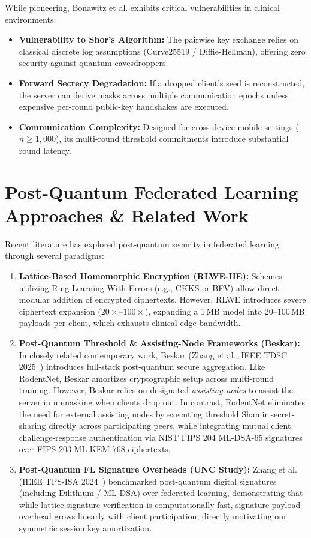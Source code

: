 \documentclass[11pt,a4paper]{report}
\begin{document}
While pioneering, Bonawitz et al. exhibits critical vulnerabilities in clinical environments:
\begin{itemize}[itemsep=2pt]
  \item \textbf{Vulnerability to Shor's Algorithm:} The pairwise key exchange relies on classical discrete log assumptions (Curve25519 / Diffie-Hellman), offering zero security against quantum eavesdroppers.
  \item \textbf{Forward Secrecy Degradation:} If a dropped client's seed is reconstructed, the server can derive masks across multiple communication epochs unless expensive per-round public-key handshakes are executed.
  \item \textbf{Communication Complexity:} Designed for cross-device mobile settings ($n \ge 1{,}000$), its multi-round threshold commitments introduce substantial round latency.
\end{itemize}

\section{Post-Quantum Federated Learning Approaches \& Related Work}
Recent literature has explored post-quantum security in federated learning through several paradigms:
\begin{enumerate}[itemsep=2pt]
  \item \textbf{Lattice-Based Homomorphic Encryption (RLWE-HE):} Schemes utilizing Ring Learning With Errors (e.g., CKKS or BFV) allow direct modular addition of encrypted ciphertexts. However, RLWE introduces severe ciphertext expansion ($20\times\text{--}100\times$), expanding a 1\,MB model into 20--100\,MB payloads per client, which exhausts clinical edge bandwidth.
  \item \textbf{Post-Quantum Threshold \& Assisting-Node Frameworks (Beskar):} In closely related contemporary work, Beskar (Zhang et al., IEEE TDSC 2025~\cite{beskar2025}) introduces full-stack post-quantum secure aggregation. Like RodentNet, Beskar amortizes cryptographic setup across multi-round training. However, Beskar relies on designated \emph{assisting nodes} to assist the server in unmasking when clients drop out. In contrast, RodentNet eliminates the need for external assisting nodes by executing threshold Shamir secret-sharing directly across participating peers, while integrating mutual client challenge-response authentication via NIST FIPS 204 ML-DSA-65 signatures over FIPS 203 ML-KEM-768 ciphertexts.
  \item \textbf{Post-Quantum FL Signature Overheads (UNC Study):} Zhang et al. (IEEE TPS-ISA 2024~\cite{unc2024}) benchmarked post-quantum digital signatures (including Dilithium / ML-DSA) over federated learning, demonstrating that while lattice signature verification is computationally fast, signature payload overhead grows linearly with client participation, directly motivating our symmetric session key amortization.
\end{enumerate}
\end{document}
